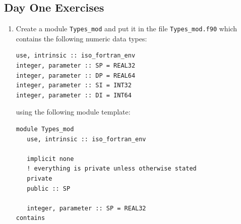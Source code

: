 \documentclass[12pt]{article}
\begin{document}
\subsection*{Day One Exercises}
\setdefaultleftmargin{0pt}{}{}{}{}{}
\begin{enumerate}
\item Create a module \texttt{Types\_mod} and put it in the file \texttt{Types\_mod.f90} which 
contains the following numeric data types:
\begin{verbatim}
use, intrinsic :: iso_fortran_env
integer, parameter :: SP = REAL32
integer, parameter :: DP = REAL64
integer, parameter :: SI = INT32
integer, parameter :: DI = INT64
\end{verbatim}
using the following module template: 
\begin{verbatim}
module Types_mod
   use, intrinsic :: iso_fortran_env

   implicit none
   ! everything is private unless otherwise stated
   private 
   public :: SP

   integer, parameter :: SP = REAL32
contains


\end{verbatim}
\end{enumerate}
\end{document}
